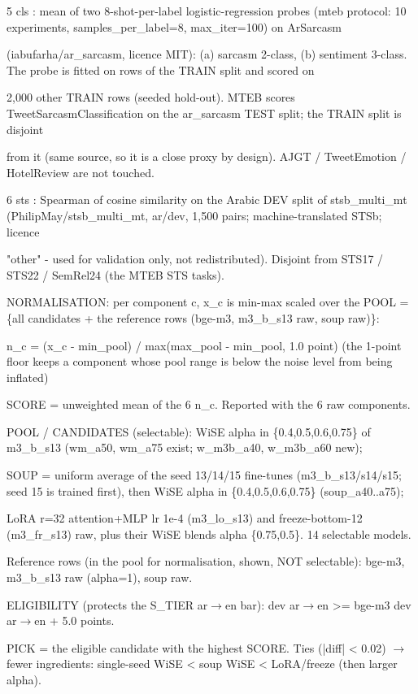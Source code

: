 {5 cls      : mean of two 8-shot-per-label logistic-regression probes (mteb protocol: 10 experiments, samples\_per\_label=8, max\_iter=100) on ArSarcasm

(iabufarha/ar\_sarcasm, licence MIT): (a) sarcasm 2-class, (b) sentiment 3-class. The probe is fitted on rows of the TRAIN split and scored on

2,000 other TRAIN rows (seeded hold-out). MTEB scores TweetSarcasmClassification on the ar\_sarcasm TEST split; the TRAIN split is disjoint

from it (same source, so it is a close proxy by design). AJGT / TweetEmotion / HotelReview are not touched.

6 sts      : Spearman of cosine similarity on the Arabic DEV split of stsb\_multi\_mt (PhilipMay/stsb\_multi\_mt, ar/dev, 1,500 pairs; machine-translated STSb; licence

"other" - used for validation only, not redistributed). Disjoint from STS17 / STS22 / SemRel24 (the MTEB STS tasks).

NORMALISATION: per component c, x\_c is min-max scaled over the POOL = \{all candidates + the reference rows (bge-m3, m3\_b\_s13 raw, soup raw)\}:

n\_c = (x\_c - min\_pool) / max(max\_pool - min\_pool, 1.0 point)     (the 1-point floor keeps a component whose pool range is below the noise level from being inflated)

SCORE = unweighted mean of the 6 n\_c. Reported with the 6 raw components.

POOL / CANDIDATES (selectable): WiSE alpha in \{0.4,0.5,0.6,0.75\} of m3\_b\_s13 (wm\_a50, wm\_a75 exist; w\_m3b\_a40, w\_m3b\_a60 new);

SOUP = uniform average of the seed 13/14/15 fine-tunes (m3\_b\_s13/s14/s15; seed 15 is trained first), then WiSE alpha in \{0.4,0.5,0.6,0.75\} (soup\_a40..a75);

LoRA r=32 attention+MLP lr 1e-4 (m3\_lo\_s13) and freeze-bottom-12 (m3\_fr\_s13) raw, plus their WiSE blends alpha \{0.75,0.5\}.  14 selectable models.

Reference rows (in the pool for normalisation, shown, NOT selectable): bge-m3, m3\_b\_s13 raw (alpha=1), soup raw.

ELIGIBILITY (protects the S\_TIER ar$\to$en bar): dev ar$\to$en >= bge-m3 dev ar$\to$en + 5.0 points.

PICK = the eligible candidate with the highest SCORE.  Ties (|diff| < 0.02) $\to$ fewer ingredients: single-seed WiSE < soup WiSE < LoRA/freeze (then larger alpha).

}
